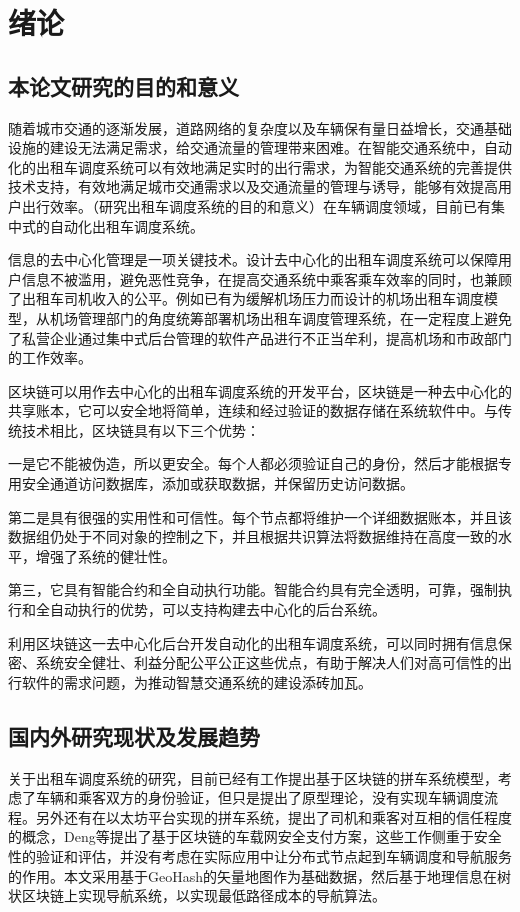 \chapter{绪论}
\section{本论文研究的目的和意义}

随着城市交通的逐渐发展，道路网络的复杂度以及车辆保有量日益增长，交通基础设施的建设无法满足需求，给交通流量的管理带来困难。在智能交通系统中，自动化的出租车调度系统可以有效地满足实时的出行需求，为智能交通系统的完善提供技术支持，有效地满足城市交通需求以及交通流量的管理与诱导，能够有效提高用户出行效率。（研究出租车调度系统的目的和意义）在车辆调度领域，目前已有集中式的自动化出租车调度系统。\par
信息的去中心化管理是一项关键技术。设计去中心化的出租车调度系统可以保障用户信息不被滥用，避免恶性竞争，在提高交通系统中乘客乘车效率的同时，也兼顾了出租车司机收入的公平。例如已有为缓解机场压力而设计的机场出租车调度模型，从机场管理部门的角度统筹部署机场出租车调度管理系统，在一定程度上避免了私营企业通过集中式后台管理的软件产品进行不正当牟利，提高机场和市政部门的工作效率。\par
区块链可以用作去中心化的出租车调度系统的开发平台，区块链是一种去中心化的共享账本，它可以安全地将简单，连续和经过验证的数据存储在系统软件中。与传统技术相比，区块链具有以下三个优势：\par
一是它不能被伪造，所以更安全。每个人都必须验证自己的身份，然后才能根据专用安全通道访问数据库，添加或获取数据，并保留历史访问数据。\par
第二是具有很强的实用性和可信性。每个节点都将维护一个详细数据账本，并且该数据组仍处于不同对象的控制之下，并且根据共识算法将数据维持在高度一致的水平，增强了系统的健壮性。\par
第三，它具有智能合约和全自动执行功能。智能合约具有完全透明，可靠，强制执行和全自动执行的优势，可以支持构建去中心化的后台系统。\par
利用区块链这一去中心化后台开发自动化的出租车调度系统，可以同时拥有信息保密、系统安全健壮、利益分配公平公正这些优点，有助于解决人们对高可信性的出行软件的需求问题，为推动智慧交通系统的建设添砖加瓦。


\section{国内外研究现状及发展趋势}
关于出租车调度系统的研究，目前已经有工作提出基于区块链的拼车系统模型，考虑了车辆和乘客双方的身份验证，但只是提出了原型理论，没有实现车辆调度流程。另外还有在以太坊平台实现的拼车系统，提出了司机和乘客对互相的信任程度的概念，Deng等提出了基于区块链的车载网安全支付方案，这些工作侧重于安全性的验证和评估，并没有考虑在实际应用中让分布式节点起到车辆调度和导航服务的作用。本文采用基于GeoHash的矢量地图作为基础数据，然后基于地理信息在树状区块链上实现导航系统，以实现最低路径成本的导航算法。\par

